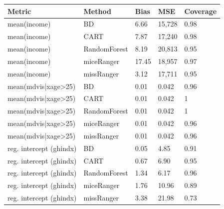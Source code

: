 \documentclass[20pt,margin=1in,innermargin=-4.5in,blockverticalspace=-0.25in]{tikzposter}
\begin{document}
\begin{columns}
{        \centering
        \begin{tabular}{|l|l|lll|}
             \hline   
             Metric &  Method & Bias \hspace{10mm} & MSE \hspace{5mm} & Coverage\\
             \hline
             mean(income) & BD & 6.66  & 15,728 & 0.98\\
             mean(income) & CART & 7.87 & 17,240 & 0.98\\
             mean(income) & RandomForest & 8.19 & 20,813 & 0.95\\
             mean(income) & miceRanger & 17.45 & 18,957 & 0.97\\
             mean(income) & missRanger  & 3.12 & 17,711 & 0.95 \\
             \hline
             mean(mdvis|xage>25) & BD & 0.01 & 0.042 & 0.96\\
             mean(mdvis|xage>25) & CART & 0.01 & 0.042 & 1\\
             mean(mdvis|xage>25) & RandomForest & 0.01 & 0.042 & 1\\
             mean(mdvis|xage>25) & miceRanger & 0.01 & 0.042 & 0.96\\
             mean(mdvis|xage>25) & missRanger  & 0.01 & 0.042 & 0.96\\
             \hline
             reg. intercept (ghindx) & BD & 0.05 & 4.85 & 0.91\\
             reg. intercept (ghindx) & CART & 0.67 & 6.90 & 0.95\\
             reg. intercept (ghindx) & RandomForest & 1.34 & 6.17 & 0.96\\
             reg. intercept (ghindx) & miceRanger & 1.76 & 10.96 & 0.89\\
             reg. intercept (ghindx) & missRanger  & 3.38 & 21.98 & 0.73\\
             \hline
        \end{tabular}

    }




\end{columns}
\end{document}
